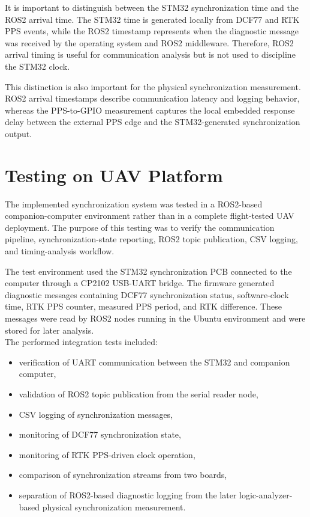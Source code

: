 It is important to distinguish between the STM32 synchronization time and the ROS2 arrival time. The STM32 time is generated locally from DCF77 and RTK PPS events, while the ROS2 timestamp represents when the diagnostic message was received by the operating system and ROS2 middleware. Therefore, ROS2 arrival timing is useful for communication analysis but is not used to discipline the STM32 clock.

This distinction is also important for the physical synchronization measurement. ROS2 arrival timestamps describe communication latency and logging behavior, whereas the PPS-to-GPIO measurement captures the local embedded response delay between the external PPS edge and the STM32-generated synchronization output.

\section{Testing on UAV Platform}

The implemented synchronization system was tested in a ROS2-based companion-computer environment rather than in a complete flight-tested UAV deployment. The purpose of this testing was to verify the communication pipeline, synchronization-state reporting, ROS2 topic publication, CSV logging, and timing-analysis workflow.

The test environment used the STM32 synchronization PCB connected to the computer through a CP2102 USB-UART bridge. The firmware generated diagnostic messages containing DCF77 synchronization status, software-clock time, RTK PPS counter, measured PPS period, and RTK difference. These messages were read by ROS2 nodes running in the Ubuntu environment and were stored for later analysis.
\\
The performed integration tests included:
\begin{itemize}
    \item verification of UART communication between the STM32 and companion computer,
    \item validation of ROS2 topic publication from the serial reader node,
    \item CSV logging of synchronization messages,
    \item monitoring of DCF77 synchronization state,
    \item monitoring of RTK PPS-driven clock operation,
    \item comparison of synchronization streams from two boards,
    \item separation of ROS2-based diagnostic logging from the later logic-analyzer-based physical synchronization measurement.
\end{itemize}

